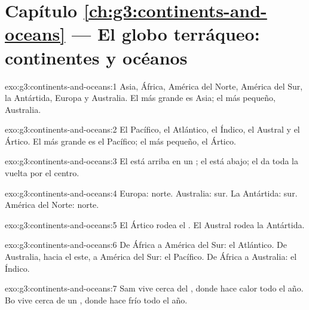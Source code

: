 \section*{Capítulo \ref{ch:g3:continents-and-oceans} --- El globo terráqueo: continentes y océanos}

\begin{solution}{exo:g3:continents-and-oceans:1}
Asia, África, América del Norte, América del Sur, la Antártida, Europa y
Australia. El más grande es Asia; el más pequeño, Australia.
\end{solution}

\begin{solution}{exo:g3:continents-and-oceans:2}
El Pacífico, el Atlántico, el Índico, el Austral y el Ártico. El más grande
es el  Pacífico; el más pequeño, el  Ártico.
\end{solution}

\begin{solution}{exo:g3:continents-and-oceans:3}
El  está arriba en un ; el  está abajo; el
 da toda la vuelta por el centro.
\end{solution}

\begin{solution}{exo:g3:continents-and-oceans:4}
Europa: norte. Australia: sur. La Antártida: sur. América del Norte: norte.
\end{solution}

\begin{solution}{exo:g3:continents-and-oceans:5}
El  Ártico rodea el . El  Austral rodea la Antártida.
\end{solution}

\begin{solution}{exo:g3:continents-and-oceans:6}
De África a América del Sur: el  Atlántico. De Australia, hacia el
este, a América del Sur: el  Pacífico. De África a Australia: el
 Índico.
\end{solution}

\begin{solution}{exo:g3:continents-and-oceans:7}
Sam vive cerca del , donde hace calor todo el año. Bo vive cerca de
un , donde hace frío todo el año.
\end{solution}

